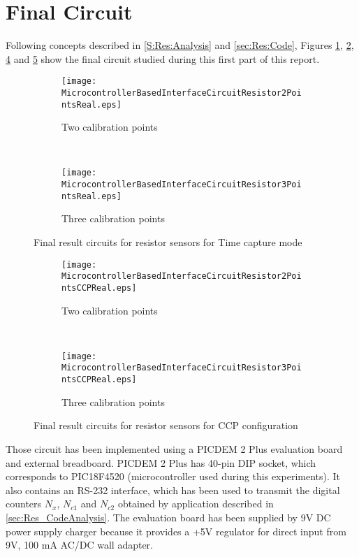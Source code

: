 \section{Final Circuit}\label{S:Res:Circuit}
Following concepts described in \ref{S:Res:Analysis} and \ref{sec:Res:Code}, Figures \ref{fig:uR2PointsReal}, \ref{fig:uR3PointsReal}, \ref{fig:uR2PointsCCPReal} and \ref{fig:uR3PointsCCPReal} show the final circuit studied during this first part of this report.
\medskip

\begin{figure}[!ht]
\centering
	\begin{subfigure}{0.45\textwidth}
	\texttt{[image: MicrocontrollerBasedInterfaceCircuitResistor2PointsReal.eps]}
	\caption{Two calibration points}
	\label{fig:uR2PointsReal}
	\end{subfigure}
	~
	\begin{subfigure}{0.45\textwidth}
	\centering
	\texttt{[image: MicrocontrollerBasedInterfaceCircuitResistor3PointsReal.eps]}
	\caption{Three calibration points}
	\label{fig:uR3PointsReal}
	\end{subfigure}
\caption{Final result circuits for resistor sensors for Time capture mode}
\label{fig:FinalCircuits}
\end{figure}

\begin{figure}[!ht]
\centering
	\begin{subfigure}{0.45\textwidth}
	\centering
	\texttt{[image: MicrocontrollerBasedInterfaceCircuitResistor2PointsCCPReal.eps]}
	\caption{Two calibration points}
	\label{fig:uR2PointsCCPReal}
	\end{subfigure}
	~
	\begin{subfigure}{0.45\textwidth}
	\centering
	\texttt{[image: MicrocontrollerBasedInterfaceCircuitResistor3PointsCCPReal.eps]}
	\caption{Three calibration points}
	\label{fig:uR3PointsCCPReal}
	\end{subfigure}
\caption{Final result circuits for resistor sensors for CCP configuration}
\label{fig:FinalCircuitsCCP}
\end{figure}

Those circuit has been implemented using a PICDEM 2 Plus evaluation board and external breadboard. PICDEM 2 Plus has 40-pin DIP socket, which corresponds to PIC18F4520 (microcontroller used during this experiments). It also contains an RS-232 interface, which has been used to transmit the digital counters $N_{x}$, $N_{c1}$ and $N_{c2}$ obtained by application described in \ref{sec:Res_CodeAnalysis}. The evaluation board has been supplied by 9V DC power supply charger because it provides a +5V regulator for direct input from 9V, 100 mA AC/DC wall adapter.
\medskip

